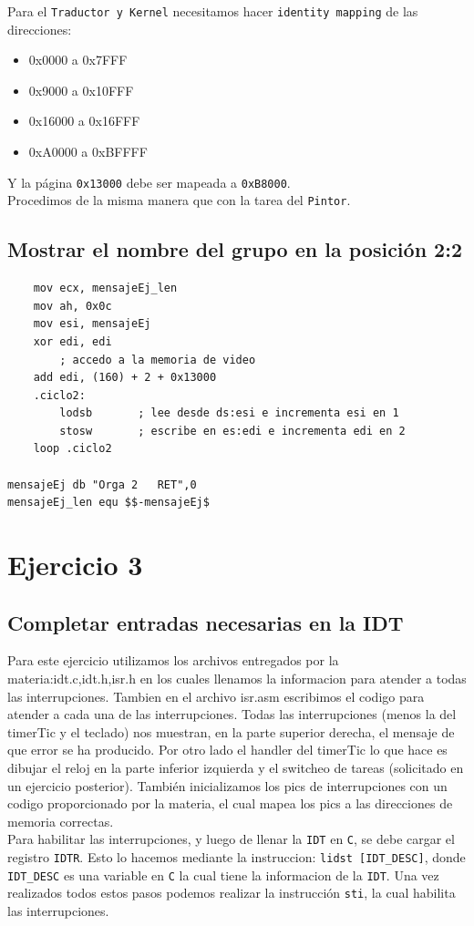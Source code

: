 \documentclass[a4paper, 10pt]{article}
\begin{document}
Para el \texttt{Traductor y Kernel} necesitamos hacer \texttt{identity mapping} de las direcciones:
\begin{itemize}
	\item 0x0000  a 0x7FFF
	\item 0x9000  a 0x10FFF
	\item 0x16000 a 0x16FFF
	\item 0xA0000 a 0xBFFFF
\end{itemize}

Y la p\'agina \texttt{0x13000} debe ser mapeada a \texttt{0xB8000}. \\ 

Procedimos de la misma manera que con la tarea del \texttt{Pintor}.

\subsection{Mostrar el nombre del grupo en la posici\'on 2:2}

\lstset{language=[x86masm]Assembler}
\begin{lstlisting}
	mov ecx, mensajeEj_len		
	mov ah, 0x0c
	mov esi, mensajeEj
	xor edi, edi
		; accedo a la memoria de video
	add edi, (160) + 2 + 0x13000
	.ciclo2:
		lodsb 		; lee desde ds:esi e incrementa esi en 1
		stosw 		; escribe en es:edi e incrementa edi en 2
	loop .ciclo2
	
mensajeEj db "Orga 2   RET",0
mensajeEj_len equ $$-mensajeEj$
\end{lstlisting}

\newpage

\section{Ejercicio 3}

\subsection{Completar entradas necesarias en la IDT}

Para este ejercicio utilizamos los archivos entregados por la materia:idt.c,idt.h,isr.h en los cuales llenamos la informacion para atender a todas las interrupciones. Tambien en el archivo isr.asm escribimos el codigo para atender a cada una de las interrupciones. Todas las interrupciones (menos la del timerTic y el teclado) nos muestran, en la parte superior derecha, el mensaje de que error se ha producido. Por otro lado el handler del timerTic lo que hace es dibujar el reloj en la parte inferior izquierda y el switcheo de tareas (solicitado en un ejercicio posterior). Tambi\'en inicializamos los pics de interrupciones con un codigo proporcionado por la materia, el cual mapea los pics a las direcciones de memoria correctas. \\ 
Para habilitar las interrupciones, y luego de llenar la \texttt{IDT} en \texttt{C}, se debe cargar el registro \texttt{IDTR}. Esto lo hacemos mediante la instruccion: \texttt{lidst [IDT\_DESC]}, donde \texttt{IDT\_DESC} es una variable en \texttt{C} la cual tiene la informacion de la \texttt{IDT}.
Una vez realizados todos estos pasos podemos realizar la instrucci\'on \texttt{sti}, la cual habilita las interrupciones.
\end{document}
